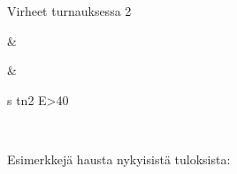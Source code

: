 \documentclass[letterpaper,10pt,finnish]{sphinxmanual}
\begin{document}
\begin{savenotes}
\begin{tabular}[t]{}
\begin{varwidth}[t]{}
\sphinxAtStartPar
Virheet turnauksessa 2
\sphinxbeforeendvarwidth
\end{varwidth}%
&\begin{varwidth}[t]{}
\sphinxbeforeendvarwidth
\end{varwidth}%
&\begin{varwidth}[t]{}
\sphinxAtStartPar
s tn2 E>40
\sphinxbeforeendvarwidth
\end{varwidth}%
\\
\sphinxbottomrule
\end{tabular}
\sphinxtableafterendhook\par
\sphinxattableend\end{savenotes}

\sphinxAtStartPar
Esimerkkejä hausta nykyisistä tuloksista:
\end{document}
